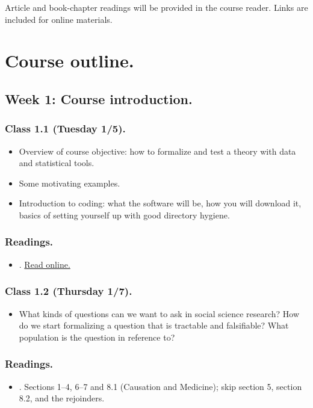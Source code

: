 \documentclass[letterpaper, 12pt, parskip=full,DIV=10]{scrartcl}
\begin{document}
Article and book-chapter readings will be provided in the course reader. Links are included for online materials.

\section*{Course outline.}

\subsection*{Week 1: Course introduction.}
\subsubsection*{Class 1.1 (Tuesday 1/5).}
\begin{itemize}
\item Overview of course objective: how to formalize and test a theory with data and statistical tools.
\item Some motivating examples.
\item Introduction to coding: what the software will be, how you will download it, basics of setting yourself up with good directory hygiene.
\end{itemize}

\subsubsection*{Readings.}
\begin{itemize}
\item {}. \href{https://marginalrevolution.com/marginalrevolution/2021/10/the-credibility-revolution-1.html}{Read online.}
\end{itemize}

\subsubsection*{Class 1.2 (Thursday 1/7).}
\begin{itemize}
\item What kinds of questions can we want to ask in social science research?
How do we start formalizing a question that is tractable and falsifiable?
What population is the question in reference to?
\end{itemize}

\subsubsection*{Readings.}
\begin{itemize}
\item {}. Sections 1--4, 6--7 and 8.1 (Causation and Medicine); skip section 5, section 8.2, and the rejoinders.
\end{itemize}
\end{document}
